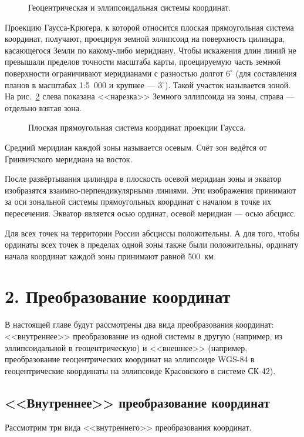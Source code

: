 \documentclass[12pt]{report}
\begin{document}
\par
\begin{figure}[h]
\caption{Геоцентрическая и эллипсоидальная системы координат.}
\label{ris:image1}
\end{figure}
\par
Проекцию Гаусса-Крюгера, к которой относится плоская прямоугольная система координат, получают, проецируя земной эллипсоид на поверхность цилиндра, касающегося Земли по какому-либо меридиану. Чтобы искажения длин линий не превышали пределов точности масштаба карты, проецируемую часть земной поверхности ограничивают меридианами с разностью долгот $6^\circ$ (для составления планов в масштабах 1:5~000 и крупнее --- $3^\circ$). Такой участок называется зоной. На рис.~\ref{ris:image2} слева показана <<нарезка>> Земного эллипсоида на зоны, справа --- отдельно взятая зона.
\begin{figure}[h]
\caption{Плоская прямоугольная система координат проекции Гаусса.}
\label{ris:image2}
\end{figure}
\par
Средний меридиан каждой зоны называется осевым. Счёт зон ведётся от Гринвичского меридиана на восток.
\par
После развёртывания цилиндра в плоскость осевой меридиан зоны и экватор изобразятся взаимно-перпендикулярными линиями. Эти изображения принимают за оси зональной системы прямоугольных координат с началом в точке их пересечения. Экватор является осью ординат, осевой меридиан --- осью абсцисс.
\par
Для всех точек на территории России абсциссы положительны. А для того, чтобы ординаты всех точек в пределах одной зоны также были положительны, ординату начала координат каждой зоны принимают равной 500~км.
\chapter*{2. Преобразование координат}
В настоящей главе будут рассмотрены два вида преобразования координат: <<внутреннее>> преобразование из одной системы в другую  (например, из эллипсоидальной в геоцентрическую) и <<внешнее>> (например, преобразование геоцентрических координат на эллипсоиде WGS-84 в геоцентрические координаты на эллипсоиде Красовского в системе СК-42).
\section*{<<Внутреннее>> преобразование координат}
Рассмотрим три вида <<внутреннего>> преобразования координат.
\end{document}
